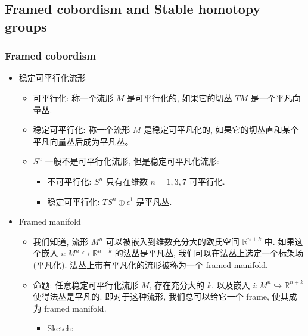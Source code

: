 \documentclass[
]{ctexart}
\providecommand{\tightlist}{%
  \setlength{\itemsep}{0pt}\setlength{\parskip}{0pt}}
\begin{document}
\subsection{Framed cobordism and Stable homotopy
groups}\label{framed-cobordism-and-stable-homotopy-groups}

\subsubsection{Framed cobordism}\label{framed-cobordism}

\begin{itemize}
\tightlist
\item
  稳定可平行化流形

  \begin{itemize}
  \tightlist
  \item
    可平行化: 称一个流形 \(M\) 是可平行化的, 如果它的切丛 \(TM\)
    是一个平凡向量丛.
  \item
    稳定可平行化: 称一个流形 \(M\) 是稳定可平凡化的,
    如果它的切丛直和某个平凡向量丛后成为平凡丛。
  \item
    \(S^n\) 一般不是可平行化流形, 但是稳定可平凡化流形:

    \begin{itemize}
    \tightlist
    \item
      不可平行化: \(S^n\) 只有在维数 \(n=1,3,7\) 可平行化.\\
    \item
      稳定可平行化: \(TS^n\oplus \epsilon^1\) 是平凡丛.
    \end{itemize}
  \end{itemize}
\item
  Framed manifold

  \begin{itemize}
  \tightlist
  \item
    我们知道, 流形 \(M^n\) 可以被嵌入到维数充分大的欧氏空间
    \(\mathbb{R}^{n+k}\) 中. 如果这个嵌入
    \(i:M^n\hookrightarrow \mathbb{R}^{n+k}\) 的法丛是平凡丛,
    我们可以在法丛上选定一个标架场(平凡化).
    法丛上带有平凡化的流形被称为一个 framed manifold.
  \item
    命题: 任意稳定可平行化流形 \(M\), 存在充分大的 \(k\), 以及嵌入
    \(i:M^n \hookrightarrow\mathbb{R}^{n+k}\) 使得法丛是平凡的.
    即对于这种流形, 我们总可以给它一个 frame, 使其成为 framed manifold.

    \begin{itemize}
    \tightlist
    \item
      Sketch:


\end{itemize}
\end{itemize}
\end{itemize}
\end{document}
